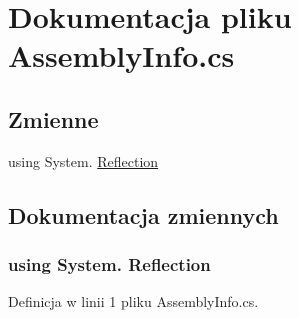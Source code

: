 \hypertarget{a00042}{
\section{Dokumentacja pliku AssemblyInfo.cs}
\label{d5/db6/a00042}
}
\subsection*{Zmienne}
\begin{CompactItemize}
\item 
﻿using System. \hyperlink{a00042_8974f59db973551affdb297a3c5ab53a}{Reflection}
\end{CompactItemize}


\subsection{Dokumentacja zmiennych}
\hypertarget{a00042_8974f59db973551affdb297a3c5ab53a}{
\subsubsection[{Reflection}]{\setlength{\rightskip}{0pt plus 5cm}﻿using System. {\bf Reflection}}}
\label{d5/db6/a00042_8974f59db973551affdb297a3c5ab53a}




Definicja w linii 1 pliku AssemblyInfo.cs.